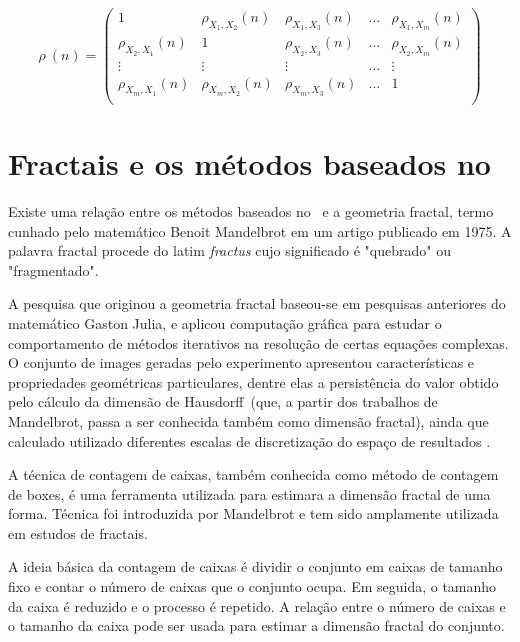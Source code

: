 \begin{equation}
  \rho~(n) = \left(\begin{matrix}
    1                     & \rho_{X_{1},X_{2}}(n) & \rho_{X_{1},X_{3}}(n) & \dots & \rho_{X_{1},X_{m}}(n) \\
    \rho_{X_{2},X_{1}}(n) & 1                     & \rho_{X_{2},X_{3}}(n) & \dots & \rho_{X_{2},X_{m}}(n) \\
    \vdots                & \vdots                & \vdots                & \dots & \vdots                \\
    \rho_{X_{m},X_{1}}(n) & \rho_{X_{m},X_{2}}(n) & \rho_{X_{m},X_{3}}(n) & \dots & 1                     \\
  \end{matrix}\right)
  \label{eq:p_dcca_matrix}
\end{equation}

\section{Fractais e os métodos baseados no \dfa}
\label{ss:dfa_fract}

Existe uma relação entre os métodos baseados no \dfa~e a geometria fractal, termo cunhado pelo matemático Benoit Mandelbrot em um artigo publicado em 1975. A palavra fractal procede do latim \textit{fractus} cujo significado é "quebrado" ou "fragmentado".

A pesquisa que originou a geometria fractal baseou-se em pesquisas anteriores do matemático Gaston Julia, e aplicou computação gráfica para estudar o comportamento de métodos iterativos na resolução de certas equações complexas. O conjunto de images geradas pelo experimento apresentou características e propriedades geométricas particulares, dentre elas a persistência do valor obtido pelo cálculo da dimensão de Hausdorff~(que, a partir dos trabalhos de Mandelbrot, passa a ser conhecida também como dimensão fractal), ainda que calculado utilizado diferentes escalas de discretização do espaço de resultados \cite{mandelbrot1983fractal}.

A técnica de contagem de caixas, também conhecida como método de contagem de boxes, é uma ferramenta utilizada para estimara a dimensão fractal de uma forma. Técnica foi introduzida por Mandelbrot e tem sido amplamente utilizada em estudos de fractais.

A ideia básica da contagem de caixas é dividir o conjunto em caixas de tamanho fixo e contar o número de caixas que o conjunto ocupa. Em seguida, o tamanho da caixa é reduzido e o processo é repetido. A relação entre o número de caixas e o tamanho da caixa pode ser usada para estimar a dimensão fractal do conjunto.

